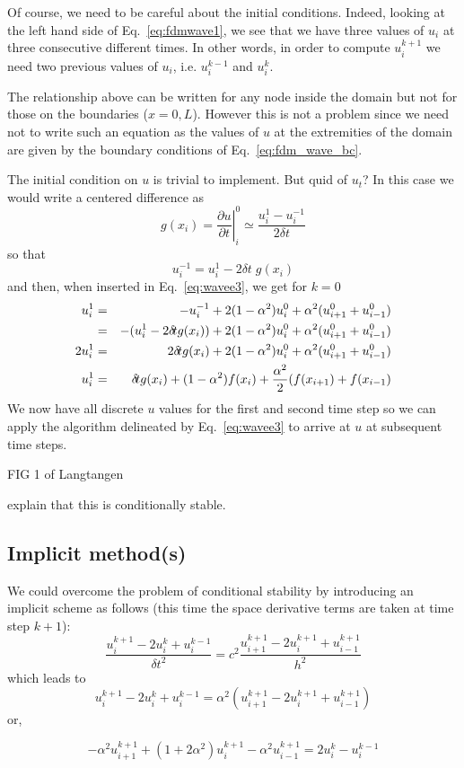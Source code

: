 Of course, we need to be careful about the initial conditions. Indeed, looking 
at the left hand side of Eq.~\eqref{eq:fdmwave1}, we see that we have three values of $u_i$
at three consecutive different times.
In other words, in order to compute $u_i^{k+1}$ we need two previous values 
of $u_i$, i.e. $u_i^{k-1}$ and $u_{i}^k$. 

The relationship above can be written for any node inside the domain but not for those on the 
boundaries ($x=0,L$). However this is not a problem since we need not to write such an equation
as the values of $u$ at the extremities of the domain are given by the boundary conditions of 
Eq.~\eqref{eq:fdm_wave_bc}.

The initial condition on $u$ is trivial to implement. But quid of $u_t$? In this case we would 
write a centered difference as 
\[
g(x_i)=\left. \frac{\partial u}{\partial t} \right|_{i}^0 \simeq \frac{u_i^1-u_i^{-1}}{2 \delta \! t} 
\]
so that 
\[
u_i^{-1} = u_i^1 - 2 \delta \! t \; g(x_i)
\]
and then, when inserted in Eq.~\eqref{eq:wavee3}, we get for $k=0$
\begin{eqnarray}
u_i^{1} 
&=& - u_i^{-1} +2(1-\alpha^2) u_{i}^0 + \alpha^2 (u_{i+1}^0 +u_{i-1}^0)  \nonumber\\
&=& - (u_i^1 - 2 \delta \! t g(x_i))  +2(1-\alpha^2) u_{i}^0 + \alpha^2 (u_{i+1}^0 +u_{i-1}^0)  \nonumber\\
2 u_i^1 &=& 2 \delta \! t g(x_i)  +2(1-\alpha^2) u_{i}^0 + \alpha^2 (u_{i+1}^0 +u_{i-1}^0)  \nonumber\\
u_i^1 &=&  \delta \! t g(x_i)  + (1-\alpha^2) f(x_{i}) + \frac{\alpha^2}{2} (f(x_{i+1}) + f(x_{i-1}) 
\end{eqnarray}
We now have all discrete $u$ values for the first and second time step so we can  
apply the algorithm delineated by Eq.~\eqref{eq:wavee3} to arrive at $u$ at subsequent time steps.

FIG 1 of Langtangen

{\color{red} explain that this is conditionally stable.}

\subsection{Implicit method(s)}

We could overcome the problem of conditional stability by 
introducing an implicit scheme as follows (this time 
the space derivative terms are taken at time step $k+1$):
\[
\frac{ u_i^{k+1} -2u_i^{k} +u_i^{k-1}  }{\delta\! t^2} = 
c^2
\frac{ u_{i+1}^{k+1} -2u_{i}^{k+1} +u_{i-1}^{k+1}  }{h^2} 
\]
which leads to 
\[
u_i^{k+1} -2u_i^{k} +u_i^{k-1}  = 
\alpha ^2 ( u_{i+1}^{k+1} -2u_{i}^{k+1} +u_{i-1}^{k+1} )
\]
or,
\begin{mdframed}[backgroundcolor=blue!5]
\begin{equation}
-\alpha^2 u_{i+1}^{k+1}+
(1+2\alpha^2) u_i^{k+1} 
-\alpha^2 u_{i-1}^{k+1}
=2 u_i^k -u_i^{k-1}
\end{equation}
\end{mdframed}

